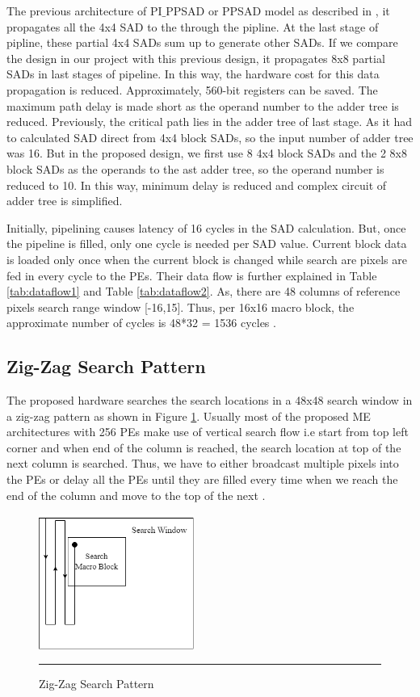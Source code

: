 The previous architecture of PI$\_$PPSAD or PPSAD model as described in \cite{huang2003hardware}, it propagates all the 4x4 SAD to the through the pipline. At the last stage of pipline, these partial 4x4 SADs sum up to generate other SADs. If we compare the design in our project with this previous design, it propagates 8x8 partial SADs in last stages of pipeline. In this way, the hardware cost for this data propagation is reduced. Approximately, 560-bit registers can be saved. The maximum path delay is made short as the operand number to the adder tree is reduced. Previously, the critical path lies in the adder tree of last stage. As it had to calculated SAD direct from 4x4 block SADs, so the input number of adder tree was 16. But in the proposed design, we first use 8 4x4 block SADs and the 2 8x8 block SADs as the operands to the ast adder tree, so the operand number is reduced to 10. In this way, minimum delay is reduced and complex circuit of adder tree is simplified.

Initially, pipelining causes latency of 16 cycles in the SAD calculation. But, once the pipeline is filled, only one cycle is needed per SAD value. Current block data is loaded only once when the current block is changed while search are pixels are fed in every cycle to the PEs. Their data flow is further explained in Table \ref{tab:dataflow1} and Table \ref{tab:dataflow2}. As, there are 48 columns of reference pixels search range window [-16,15]. Thus, per 16x16 macro block, the approximate number of cycles is 48*32 = 1536 cycles \cite{lin2008parallel}.

\subsection{Zig-Zag Search Pattern}

The proposed hardware searches the search locations in a 48x48 search window in a zig-zag pattern as shown in Figure \ref{fig:zigzag}. Usually most of the proposed ME architectures with 256 PEs make use of vertical search flow i.e start from top left corner and when end of the column is reached, the search location at top of the next column is searched. Thus, 
we have to either broadcast multiple pixels into the PEs or delay all the PEs until they are filled every time when we reach the end of the column and move to the top of the next \cite{hardware_architecture_design}.

\begin{figure}[H]
	\centering
	\includegraphics[width = 2in]{./Figures/zigzag.png}
	\rule{35em}{0.5pt}
	\caption{Zig-Zag Search Pattern}
	\label{fig:zigzag}
\end{figure}

